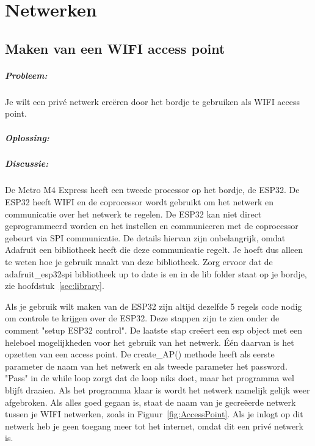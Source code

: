 \chapter{Netwerken}

\section{Maken van een WIFI access point}\label{sec:AccesPoint}
	\paragraph{Probleem:} Je wilt een privé netwerk creëren door het bordje te gebruiken als WIFI access point.
	
	\paragraph{Oplossing:}
	
	\paragraph{Discussie:} De Metro M4 Express heeft een tweede processor op het bordje, de ESP32. De ESP32 heeft WIFI en de coprocessor wordt gebruikt om het netwerk en communicatie over het netwerk te regelen. De ESP32 kan niet direct geprogrammeerd worden en het instellen en communiceren met de coprocessor gebeurt via SPI communicatie. De details hiervan zijn onbelangrijk, omdat Adafruit een bibliotheek heeft die deze communicatie regelt. Je hoeft dus alleen te weten hoe je gebruik maakt van deze bibliotheek. Zorg ervoor dat de adafruit\_esp32spi bibliotheek up to date is en in de lib folder staat op je bordje, zie hoofdstuk~\ref{sec:library}.
	
	Als je gebruik wilt maken van de ESP32 zijn altijd dezelfde 5 regels code nodig om controle te krijgen over de ESP32. Deze stappen zijn te zien onder de comment "setup ESP32 control". De laatste stap cre\"eert een esp object met een heleboel mogelijkheden voor het gebruik van het netwerk. \'E\'en daarvan is het opzetten van een access point. De create\_AP() methode heeft als eerste parameter de naam van het netwerk en als tweede parameter het password. "Pass" in de while loop zorgt dat de loop niks doet, maar het programma wel blijft draaien. Als het programma klaar is wordt het netwerk namelijk gelijk weer afgebroken. Als alles goed gegaan is, staat de naam van je gecreëerde netwerk tussen je WIFI netwerken, zoals in Figuur~\ref{fig:AccessPoint}. Als je inlogt op dit netwerk heb je geen toegang meer tot het internet, omdat dit een priv\'e netwerk is.
	

